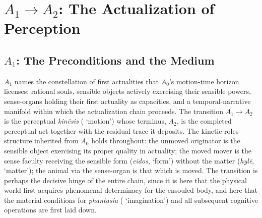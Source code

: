 \section{$A_1 \rightarrow A_2$: The Actualization of Perception}

\subsection{$A_1$: The Preconditions and the Medium}

$A_1$ names the constellation of first actualities that $A_0$'s motion-time horizon licenses: rational souls, sensible objects actively exercising their sensible powers, sense-organs holding their first actuality as capacities, and a temporal-narrative manifold within which the actualization chain proceeds. The transition $A_1 \rightarrow A_2$ is the perceptual \textit{kinēsis} ( `motion') whose terminus, $A_2$, is the completed perceptual act together with the residual trace it deposits. The kinetic-roles structure inherited from $A_0$ holds throughout: the unmoved originator is the sensible object exercising its proper quality in actuality; the moved mover is the sense faculty receiving the sensible form (\textit{eidos},  `form') without the matter (\textit{hylē},  `matter'); the animal via the sense-organ is that which is moved. The transition is perhaps the decisive hinge of the entire chain, since it is here that the physical world first acquires phenomenal determinacy for the ensouled body, and here that the material conditions for \textit{phantasia} ( `imagination') and all subsequent cognitive operations are first laid down.

